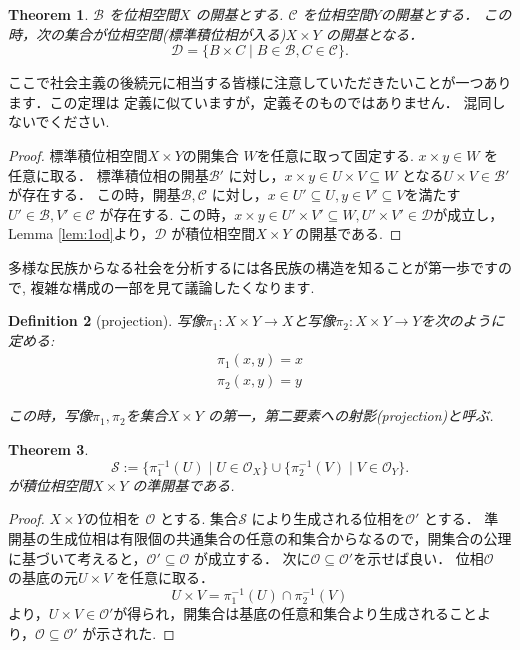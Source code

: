 \documentclass[lualatex]{ltjsbook}
\newtheorem{theorem}{Theorem}[section]
\newtheorem{definition}[theorem]{Definition}
\theoremstyle{remark}
\theoremstyle{plain}
\begin{document}
\begin{theorem}
$\mathcal{B}$ を位相空間$X$ の開基とする.
$\mathcal{C}$ を位相空間$Y$の開基とする．
この時，次の集合が位相空間(標準積位相が入る)$X \times Y$ の開基となる．
\[
\mathcal{D}= \{B \times C  \mid B \in \mathcal{B} , C \in \mathcal{C} \}
.\] 
\end{theorem}

ここで社会主義の後続元に相当する皆様に注意していただきたいことが一つあります．この定理は
定義に似ていますが，定義そのものではありません． 混同しないでください.
\begin{proof}
	標準積位相空間$X \times Y$の開集合 $W$を任意に取って固定する. 
	$x\times y \in W$ を任意に取る．
	標準積位相の開基$\mathcal{B'}$ に対し，$x \times y \in U \times V \subseteq W$ となる$U \times V \in \mathcal{B'}$ が存在する．
	この時，開基$\mathcal{B},\mathcal{C}$ に対し，$x \in U' \subseteq U, y \in V' \subseteq V$を満たす $U' \in \mathcal{B},V' \in \mathcal{C}$ が存在する.
	この時，$x\times y \in U' \times V' \subseteq W,U' \times V' \in \mathcal{D}$が成立し，Lemma \ref{lem:1od}より，$\mathcal{D}$ が積位相空間$X\times Y$ の開基である.
\end{proof}

多様な民族からなる社会を分析するには各民族の構造を知ることが第一歩ですので, 複雑な構成の一部を見て議論したくなります.

\begin{definition}[projection]
	写像$\pi_1 : X \times Y \to X$と写像$\pi_2 : X \times Y \to Y$を次のように定める:
	\[
	\begin{aligned}
		\pi_1(x,y) =x \\
		\pi_2(x,y)=y
	\end{aligned}
	\] 

	この時，写像$\pi_1,\pi_2$を集合$X \times Y$ の第一，第二要素への射影(projection)と呼ぶ.
\end{definition}

\begin{theorem}
	\[
	\mathcal{S}:= \{\pi_1^{-1} \left( U \right)  \mid U \in \mathcal{O}_X		\} \cup \{ \pi_2^{-1} \left( V \right)   \mid  V \in \mathcal{O}_Y\} 
	.\] 
	が積位相空間$X \times Y$ の準開基である.
\end{theorem}

\begin{proof}
	$X\times Y$の位相を $\mathcal{O}$ とする.
	集合$\mathcal{S}$ により生成される位相を$\mathcal{O}'$ とする．
	準開基の生成位相は有限個の共通集合の任意の和集合からなるので，開集合の公理に基づいて考えると，$\mathcal{O}' \subseteq \mathcal{O}$ が成立する．
	次に$\mathcal{O} \subseteq \mathcal{O}'$を示せば良い．
	位相$\mathcal{O}$ の基底の元$U\times V $ を任意に取る．
	$$
	U \times V = \pi_1^{-1}\left( U \right) \cap \pi_2^{-1}\left( V \right)  
	$$
	より，$U \times V \in \mathcal{O}'$が得られ，開集合は基底の任意和集合より生成されることより，$\mathcal{O} \subseteq \mathcal{O}'$ が示された.
\end{proof}
\end{document}
